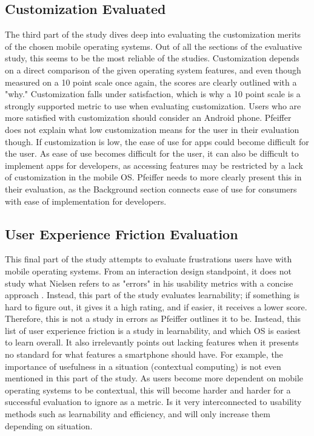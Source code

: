 \documentclass[11pt]{article}
\begin{document}
\subsection{Customization Evaluated}
The third part of the study dives deep into evaluating the customization merits of the chosen mobile operating systems. Out of all the sections of the evaluative study, this seems to be the most reliable of the studies. Customization depends on a direct comparison of the given operating system features, and even though measured on a 10 point scale once again, the scores are clearly outlined with a "why." Customization falls under satisfaction, which is why a 10 point scale is a strongly supported metric to use when evaluating customization. Users who are more satisfied with customization should consider an Android phone. Pfeiffer does not explain what low customization means for the user in their evaluation though. If customization is low, the ease of use for apps could become difficult for the user. As ease of use becomes difficult for the user, it can also be difficult to implement apps for developers, as accessing features may be restricted by a lack of customization in the mobile OS. Pfeiffer needs to more clearly present this in their evaluation, as the Background section connects ease of use for consumers with ease of implementation for developers.
\subsection{User Experience Friction Evaluation}
This final part of the study attempts to evaluate frustrations users have with mobile operating systems. From an interaction design standpoint, it does not study what Nielsen refers to as "errors" in his usability metrics with a concise approach \cite{Nielsen}. Instead, this part of the study evaluates learnability; if something is hard to figure out, it gives it a high rating, and if easier, it receives a lower score. Therefore, this is not a study in errors as Pfeiffer outlines it to be. Instead, this list of user experience friction is a study in learnability, and which OS is easiest to learn overall. It also irrelevantly points out lacking features when it presents no standard for what features a smartphone should have. For example, the importance of usefulness in a situation (contextual computing) is not even mentioned in this part of the study. As users become more dependent on mobile operating systems to be contextual, this will become harder and harder for a successful evaluation to ignore as a metric. Is it very interconnected to usability methods such as learnability and efficiency, and will only increase them depending on situation.
\end{document}
